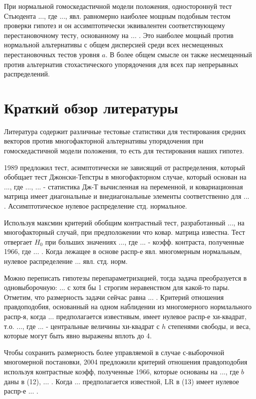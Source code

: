 \documentclass{article}
\begin{document}
При нормальной гомоскедастичной модели положения, одностороннуй тест Стьюдента ..., где ..., явл. равномерно наиболее мощным подобным тестом проверки гипотез и он ассимптотически эквивалентен соответствующему перестановочному тесту, основанному на ... . Это наиболее мощный против нормальной альтернативы с общем дисперсией среди всех несмещенных перестановочных тестов уровня $a$. В более общем смысле он также несмещенный против альтернатив стохастического упорядочения для всех пар непрерывных распределений.

\section{Краткий обзор литературы}
Литература содержит различные тестовые статистики для тестирования средних векторов против многофакторной альтернативы упорядочения при гомоскедастичной модели положения, то есть для тестирования наших гипотез.

1989 предложил тест, асимптотически не зависящий от распределения, который обобщает тест Джонски-Тепстры в многофакторном случае, который основан на ..., где ..., ... - статистика Дж-Т вычисленная на переменной, и ковариационная матрица имеет диагональные и внедиагональные элементы соответственно для ... . Ассимптотическое нулевое распределение стд. нормальное.

Используя максмин критерий обобщим контрастный тест, разработанный ..., на многофакторный случай, при предположении что ковар. матрица известна. Тест отвергает $H_0$ при больших значениях ..., где ... - коэфф. контраста, полученные 1966, где ... . Когда лежащее в основе распр-е явл. многомерным нормальным, нулевое распределение ... явл. стд. норм.

Можно переписать гипотезы перепараметризацией, тогда задача преобразуется в одновыборочную: ... с хотя бы 1 строгим неравенством для какой-то пары. Отметим, что размерность задачи сейчас равна ... . Критерий отношения правдоподобия, основанный на одном наблидении из многомерного нормлального распр-я, когда ... предполагается известнвым, имеет нулевое распр-е хи-квадрат, т.о. ..., где ... - центральные величины хи-квадрат с $h$ степенями свободы, и веса, которые могут быть явно выражены вплоть до 4.

Чтобы сохранить размерность более управляемой в случае с-выборочной многомерной постановки, 2004 предложили критерий отношения правдоподобия используя контрастные коэфф, полученные 1966, которые основаны на ..., где $b$ даны в (12), ... . Когда ... предполагается известной, LR в (13) имеет нулевое распр-е ... .
\end{document}
